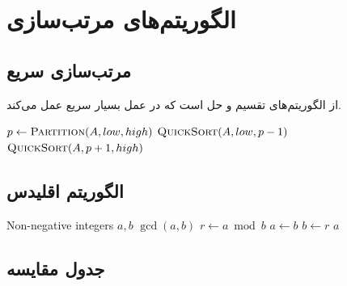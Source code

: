 \documentclass{matinbook}
\begin{document}
\chapter{الگوریتم‌های مرتب‌سازی}
\label{chap:sorting}

\section{مرتب‌سازی سریع}

از الگوریتم‌های تقسیم و حل
است که در عمل بسیار سریع عمل می‌کند.

\begin{latin}
\begin{algorithm}
\begin{algorithmic}[1]
            \State $p \gets \Call{Partition}{A, low, high}$
            \State $\Call{QuickSort}{A, low, p-1}$
            \State $\Call{QuickSort}{A, p+1, high}$
        \EndIf
    \EndFunction
\end{algorithmic}
\end{algorithm}
\end{latin}

\section{الگوریتم اقلیدس}

\begin{latin}
\begin{algorithm}
\begin{algorithmic}[1]
    \Require Non-negative integers $a, b$
    \Ensure $\gcd(a, b)$
        \State $r \gets a \bmod b$
        \State $a \gets b$
        \State $b \gets r$
    \EndWhile
    \State \Return $a$
\end{algorithmic}
\end{algorithm}
\end{latin}

\section{جدول مقایسه}
\end{document}
